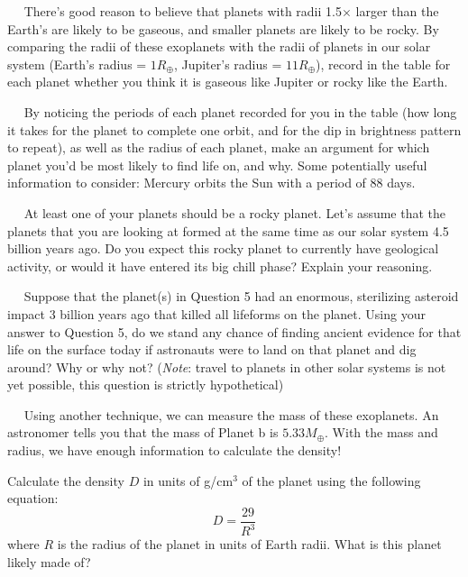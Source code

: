 \documentclass[12pt]{article}
\newcommand{\question}[1]{\vspace{10mm} \noindent {\bf #1)}~~}
\begin{document}
\question{3} There's good reason to believe that planets with radii 1.5$\times$ larger than the Earth's are likely to be gaseous, and smaller planets are likely to be rocky. By comparing the radii of these exoplanets with the radii of planets in our solar system (Earth's radius = $1 R_\oplus$, Jupiter's radius = $11 R_\oplus$), record in the table for each planet whether you think it is gaseous like Jupiter or rocky like the Earth.


\question{4} By noticing the periods of each planet recorded for you in the table (how long it takes for the planet to complete one orbit, and for the dip in brightness pattern to repeat), as well as the radius of each planet, make an argument for which planet you'd be most likely to find life on, and why. Some potentially useful information to consider: Mercury orbits the Sun with a period of 88 days.
\vspace{6 cm}

\question{5} At least one of your planets should be a rocky planet. Let's assume that the planets that you are looking at formed at the same time as our solar system 4.5 billion years ago. Do you expect this rocky planet to currently have geological activity, or would it have entered its big chill phase? Explain your reasoning.
\vspace{6 cm}


\question{6} Suppose that the planet(s) in Question 5 had an enormous, sterilizing asteroid impact 3 billion years ago that killed all lifeforms on the planet. Using your answer to Question 5, do we stand any chance of finding ancient evidence for that life on the surface today if astronauts were to land on that planet and dig around? Why or why not? ({\it Note}: travel to planets in other solar systems is not yet possible, this question is strictly hypothetical)
\vspace{6 cm}

\question{7} Using another technique, we can measure the mass of these exoplanets. An astronomer tells you that the mass of Planet b is $5.33 M_\oplus$. With the mass and radius, we have enough information to calculate the density! 

Calculate the density $D$ in units of g/cm$^3$ of the planet using the following equation: 
\begin{equation}
D = \frac{29}{R^3}
\end{equation}
where $R$ is the radius of the planet in units of Earth radii. What is this planet likely made of?
\end{document}
